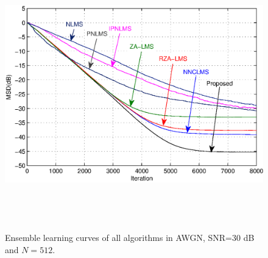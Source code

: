 \begin{figure}[!htb]
\begin{center}
\vspace{1cm}
\includegraphics[width=14.25cm, height=11cm]{Figures/Chapter5/fig4.eps}\\
\end{center}
\vspace{-1cm}
\caption{Ensemble learning curves of all algorithms in AWGN, SNR=30 dB and $N=512$.}
\label{fig4}
\vspace{1.5cm}
\end{figure}


